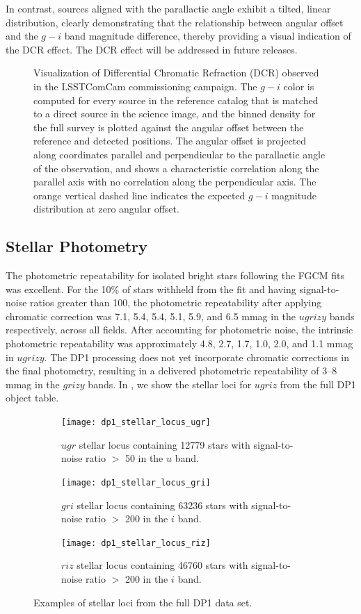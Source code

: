In contrast, sources aligned with the parallactic angle exhibit a tilted, linear distribution, clearly demonstrating that the relationship between angular offset and the $g-i$ band magnitude difference, thereby providing a visual indication of the \gls{DCR} effect.
The DCR effect will be addressed in future releases. 

\begin{figure}[htb!]
\caption{Visualization of \gls{Differential Chromatic Refraction} (DCR) observed in the LSSTComCam commissioning campaign. The $g-i$ color is computed for every source in the reference catalog that is matched to a direct source in the science image, and the binned density for the full survey is plotted against the angular offset between the reference and detected positions. The angular offset is projected along coordinates parallel and perpendicular to the parallactic angle of the observation, and shows a characteristic correlation along the parallel axis with no correlation along the perpendicular axis. The orange vertical dashed line indicates the expected $g-i$ magnitude distribution at zero angular offset.}
\label{fig:dcr}
\end{figure}

\subsection{Stellar Photometry}
The photometric repeatability for isolated bright stars following the \gls{FGCM} fits was excellent. 
For the 10\% of stars withheld from the fit and having signal-to-noise ratios greater than 100, the photometric repeatability 
after applying chromatic correction was 7.1, 5.4, 5.4, 5.1, 5.9, and 6.5  mmag in the $ugrizy$ bands respectively, across all fields.
After accounting for photometric noise, the intrinsic photometric repeatability was approximately 4.8, 2.7, 1.7, 1.0, 2.0, and 1.1 mmag in $ugrizy$.
The DP1 processing does not yet incorporate chromatic corrections in the final photometry, resulting in a delivered photometric repeatability of 3--8 mmag in the $grizy$ bands.
In , we show the stellar loci for $ugriz$ from the full DP1 object table.
\begin{figure}[hbt!]
  \centering
  \begin{subfigure}[t]{0.31\textwidth}
  \texttt{[image: dp1\_stellar\_locus\_ugr]}
  \caption{$ugr$ stellar locus containing 12779 stars with signal-to-noise ratio $>$ 50 in the $u$ band.}
  \end{subfigure}\hfill
  \begin{subfigure}[t]{0.31\textwidth}
  \texttt{[image: dp1\_stellar\_locus\_gri]}
  \caption{$gri$ stellar locus containing 63236 stars with signal-to-noise ratio $>$ 200 in the $i$ band.}
  \end{subfigure}\hfill
    \begin{subfigure}[t]{0.31\textwidth}
  \texttt{[image: dp1\_stellar\_locus\_riz]}
  \caption{$riz$ stellar locus containing 46760 stars with signal-to-noise ratio $>$ 200 in the $i$ band.}
  \end{subfigure}\hfill
\caption{Examples of stellar loci from the full DP1 data set.}
  \label{fig:stellarloci}
\end{figure}


